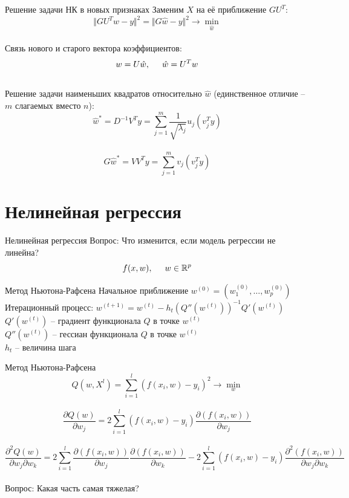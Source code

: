 \documentclass[10pt]{beamer}
\begin{document}
\begin{frame}{Решение задачи НК в новых признаках}
	Заменим $X$ на её приближение $GU^T$:\\
	$$\Vert GU^Tw -y \Vert^2 = \Vert G\hat{w} -y \Vert^2 \rightarrow \min\limits_{\hat{w}}$$\\
	Связь нового и старого вектора коэффициентов:\\
	$$w = U\hat{w}, \hspace{5mm} \hat{w} = U^T w$$\\
	\pause
	\bigbreak
	Решение задачи наименьших квадратов относительно $\hat{w}$ (единственное отличие -- $m$ слагаемых вместо $n$):\\
	$$\hat{w}^* = D^{-1}V^Ty = \sum\limits_{j=1}^m \frac{1}{\sqrt{\lambda_j}} u_j (v_j^Ty)$$\\
	$$G\hat{w}^* = VV^Ty = \sum\limits_{j=1}^m v_j (v_j^Ty)$$
\end{frame}

\section{Нелинейная регрессия}

\begin{frame}{Нелинейная регрессия}
	\alert{Вопрос:} Что изменится, если модель регрессии не линейна?\\
	\bigbreak
	$$f(x, w), \hspace{5mm} w \in \mathbb{R}^p$$
\end{frame}

\begin{frame}{Метод Ньютона-Рафсена}
	Начальное приближение $w^{(0)} = (w_1^{(0)}, \dots, w_p^{(0)})$\\
	Итерационный процесс: $w^{(t+1)} = w^{(t)} - h_t (Q''(w^{(t)}))^{-1}Q'(w^{(t)})$\\
	\bigbreak
	$Q'(w^{(t)})$ -- градиент функционала $Q$ в точке $w^{(t)}$\\
	$Q''(w^{(t)})$ -- гессиан функционала $Q$ в точке $w^{(t)}$\\
	$h_t$ -- величина шага
\end{frame}

\begin{frame}{Метод Ньютона-Рафсена}
	$$Q(w,X^l) = \sum\limits_{i=1}^l (f (x_i, w) - y_i)^2 \rightarrow \min\limits_{w}$$\\
	\pause
	$$\frac{\partial Q(w)}{\partial w_j} = 2 \sum\limits_{i=1}^l (f(x_i, w) - y_i ) \frac{\partial(f(x_i, w))}{\partial w_j}$$\\
	\pause
	$$\frac{\partial^2 Q(w)}{\partial w_j \partial w_k} = 2 \sum\limits_{i=1}^l \frac{\partial(f(x_i, w))}{\partial w_j} \frac{\partial(f(x_i, w))}{\partial w_k} - 2 \sum\limits_{i=1}^l (f(x_i, w) - y_i ) \frac{\partial^2 (f(x_i, w))}{\partial w_j \partial w_k}$$\\
	\bigbreak
	\pause
	\alert{Вопрос:} Какая часть самая тяжелая?
\end{frame}
\end{document}
